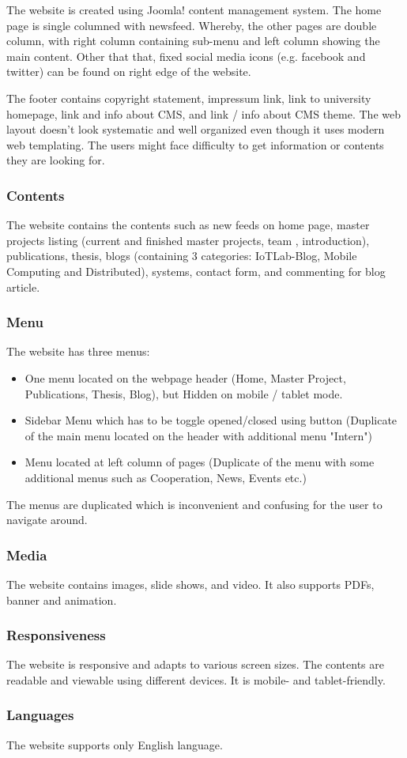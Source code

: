 The website is created using Joomla! content management system. The home page is single columned with newsfeed. Whereby, the other pages are double column, with right column containing sub-menu and left column showing the main content. Other that that, fixed social media icons (e.g. facebook and twitter) can be found on right edge of the website.

The footer contains copyright statement, impressum link, link to university homepage, link and info about CMS, and link / info about CMS theme. The web layout doesn't look systematic and well organized even though 
it uses modern web templating. The users might face difficulty to get  information or contents they are looking for.

\subsubsection*{Contents}
The website contains the contents such as new feeds on home page, master projects listing (current and finished master projects, team , introduction), publications, thesis, blogs (containing 3 categories: IoTLab-Blog, Mobile Computing and Distributed), systems, contact form, and commenting for blog article.

\subsubsection*{Menu}
The website has three menus:
\begin{itemize}
\item One menu located on the webpage header (Home, Master Project, Publications,  Thesis, Blog), but Hidden on mobile / tablet mode.
\item Sidebar Menu which has to be toggle opened/closed using button (Duplicate of  the main menu located on the header with additional menu "Intern")
\item Menu located at left column of pages (Duplicate of the menu with some  additional menus such as Cooperation, News, Events etc.)
\end{itemize}

The menus are duplicated which is inconvenient and confusing for the user to navigate around.

\subsubsection*{Media}
The website contains images, slide shows, and video. It also supports PDFs, banner and animation.

\subsubsection*{Responsiveness}
The website is responsive and adapts to various screen sizes. The contents are readable and viewable using different devices. It is mobile- and tablet-friendly.

\subsubsection*{Languages}
The website supports only English language.

